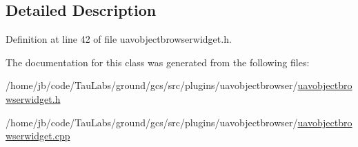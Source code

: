 \subsection{\-Detailed \-Description}


\-Definition at line 42 of file uavobjectbrowserwidget.\-h.



\-The documentation for this class was generated from the following files\-:\begin{DoxyCompactItemize}
\item 
/home/jb/code/\-Tau\-Labs/ground/gcs/src/plugins/uavobjectbrowser/\hyperlink{uavobjectbrowserwidget_8h}{uavobjectbrowserwidget.\-h}\item 
/home/jb/code/\-Tau\-Labs/ground/gcs/src/plugins/uavobjectbrowser/\hyperlink{uavobjectbrowserwidget_8cpp}{uavobjectbrowserwidget.\-cpp}\end{DoxyCompactItemize}

